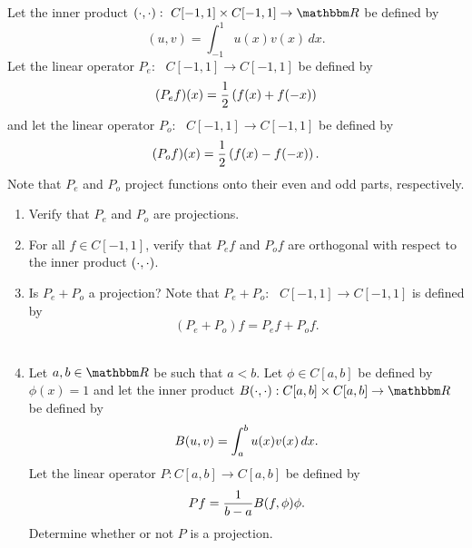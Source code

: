 
Let the inner product $\ip{\cdot,\cdot}:\mbox{ }C[-1,1]\times C[-1,1]\rightarrow\R$ be defined by
\[
(u,v) = \int_{-1}^1 u(x) v(x)\,dx.
\]
Let the linear operator $P_e:\mbox{ }C[-1,1]\rightarrow C[-1,1]$ be defined by
\[
(P_e f)(x) = {1 \over 2}\left(f(x)+f(-x)\right)
\]
and let the linear operator $P_o:\mbox{ }C[-1,1]\rightarrow C[-1,1]$ be defined by
\[
(P_o f)(x) = {1 \over 2}\left(f(x)-f(-x)\right).
\]
Note that $P_e$ and $P_o$ project functions onto their even and odd parts, respectively.
\\
\begin{enumerate}
\item Verify that $P_e$ and $P_o$ are projections.
\\
\item For all $f\in C[-1,1]$, verify that $P_e f$ and $P_o f$ are orthogonal with respect to the inner product $(\cdot,\cdot)$.
\\
\item Is $P_e+P_o$ a projection? Note that $P_e+P_o:\mbox{ }C[-1,1]\rightarrow C[-1,1]$ is defined by
\[
(P_e+P_o)f=P_ef+P_of.
\]
\\
\item Let $a,b\in\R$ be such that $a<b$. Let $\phi\in C[a,b]$ be defined by $\phi(x)=1$ and let the inner product $B\ip{\cdot,\cdot}:C[a,b]\times C[a,b]\to\R$ be defined by
\[
B(u,v)=\int_a^bu(x)v(x)\,dx.
\]
Let the linear operator $P: C[a,b]\rightarrow C[a,b]$ be defined by
\[
Pf=\frac{1}{b-a}B(f,\phi)\phi.
\]
Determine whether or not $P$ is a projection.
\end{enumerate}



